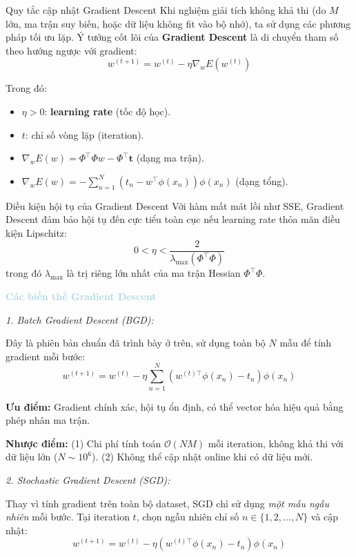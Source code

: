 \begin{importantbox}{Quy tắc cập nhật Gradient Descent}
Khi nghiệm giải tích không khả thi (do $M$ lớn, ma trận suy biến, hoặc dữ liệu không fit vào bộ nhớ), ta sử dụng các phương pháp tối ưu lặp. Ý tưởng cốt lõi của \textbf{Gradient Descent} là di chuyển tham số theo hướng ngược với gradient:
$$w^{(t+1)} = w^{(t)} - \eta \nabla_w E(w^{(t)})$$

Trong đó:
\begin{itemize}
    \item $\eta > 0$: \textbf{learning rate} (tốc độ học).
    \item $t$: chỉ số vòng lặp (iteration).
    \item $\nabla_w E(w) = \Phi^{\top}\Phi w - \Phi^{\top}\mathbf{t}$ (dạng ma trận).
    \item $\nabla_w E(w) = -\sum_{n=1}^{N}(t_n - w^{\top}\phi(x_n))\phi(x_n)$ (dạng tổng).
\end{itemize}
\end{importantbox}

\begin{notebox}{Điều kiện hội tụ của Gradient Descent}
Với hàm mất mát lồi như SSE, Gradient Descent đảm bảo hội tụ đến cực tiểu toàn cục nếu learning rate thỏa mãn điều kiện Lipschitz: 
$$0 < \eta < \frac{2}{\lambda_{\max}(\Phi^{\top}\Phi)}$$
trong đó $\lambda_{\max}$ là trị riêng lớn nhất của ma trận Hessian $\Phi^{\top}\Phi$.
\end{notebox}

\vspace{0.5em}
\noindent\textcolor{lightblue}{\textbf{Các biến thể Gradient Descent}}
\vspace{0.5em}

\noindent\textcolor{infocolor}{\textit{1. Batch Gradient Descent (BGD):}}

Đây là phiên bản chuẩn đã trình bày ở trên, sử dụng toàn bộ $N$ mẫu để tính gradient mỗi bước:
$$w^{(t+1)} = w^{(t)} - \eta \sum_{n=1}^{N}(w^{(t)\top}\phi(x_n) - t_n)\phi(x_n)$$

\textbf{Ưu điểm:} Gradient chính xác, hội tụ ổn định, có thể vector hóa hiệu quả bằng phép nhân ma trận.

\textbf{Nhược điểm:} (1) Chi phí tính toán $\mathcal{O}(NM)$ mỗi iteration, không khả thi với dữ liệu lớn ($N \sim 10^6$). (2) Không thể cập nhật online khi có dữ liệu mới.

\noindent\textcolor{infocolor}{\textit{2. Stochastic Gradient Descent (SGD):}}

Thay vì tính gradient trên toàn bộ dataset, SGD chỉ sử dụng \textit{một mẫu ngẫu nhiên} mỗi bước. Tại iteration $t$, chọn ngẫu nhiên chỉ số $n \in \{1, 2, \ldots, N\}$ và cập nhật:
$$w^{(t+1)} = w^{(t)} - \eta (w^{(t)\top}\phi(x_n) - t_n)\phi(x_n)$$

